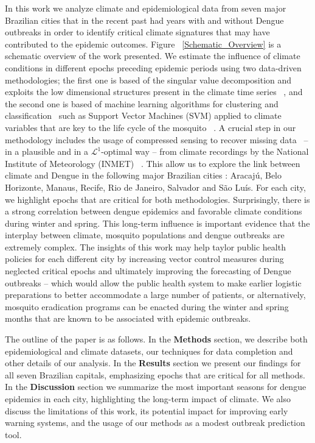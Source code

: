 \documentclass[final,leqno]{siamltexmm2}
\begin{document}
In this work we analyze climate and epidemiological data from seven major Brazilian cities that in the recent past 
had years with and without Dengue outbreaks in order to identify critical climate signatures that may have contributed 
to the epidemic outcomes.  Figure ~\ref{Schematic_Overview} is a schematic overview of the work presented. We estimate the influence of 
climate conditions in different epochs preceding epidemic periods using two data-driven methodologies; the first one is 
based of the singular value decomposition and exploits the low dimensional structures present in the climate time series 
~\cite{Golub,Kutz}, and the second one is based of machine learning algorithms for clustering and classification~\cite{murphy,bishop} such as Support Vector Machines (SVM) 
applied to climate variables that are key to the life cycle of the mosquito ~\cite{Vapnik,Burges}. A crucial step in our methodology 
includes the usage of compressed sensing to recover missing data~\cite{Kutz,cs1,cs2,cs3,cs4} -- in a plausible and in a $\mathcal{L}^{1}$-optimal way -- 
from climate recordings by the National Institute of Meteorology (INMET) ~\cite{INMET}. 
%
This allow us to explore the link between climate and Dengue in 
the following  major Brazilian cities : Aracajú, Belo Horizonte, Manaus, Recife, Rio de Janeiro, Salvador and São Luís. 
%
For each city, we highlight epochs that are critical for both methodologies. Surprisingly, there is a strong correlation between 
dengue epidemics and favorable climate conditions during winter and spring. This long-term influence is important evidence 
that the interplay between climate, mosquito populations and dengue outbreaks are extremely complex.
%    
The insights of this work may help taylor public health policies for each different city by increasing vector control measures 
during neglected critical epochs and ultimately improving the forecasting of Dengue outbreaks -- which would allow the public 
health system to make earlier logistic preparations to better accommodate a large number of patients, or alternatively, mosquito eradication programs can be enacted during the winter and spring months that are known to be associated with epidemic outbreaks.

The outline of the paper is as follows. In the \textbf{Methods} section,  we describe both epidemiological and climate datasets, our techniques for data completion and other details of our analysis.  In the \textbf{Results} section we present our findings for all seven Brazilian capitals, emphasizing epochs that are critical for all methods. In the \textbf{Discussion} section we summarize the most important seasons for dengue epidemics in each city, highlighting the long-term impact of climate. We also discuss the limitations of this work,  its potential impact for improving early warning systems, and the usage of our methods as a modest outbreak prediction tool. 
%
%
%
\end{document}
